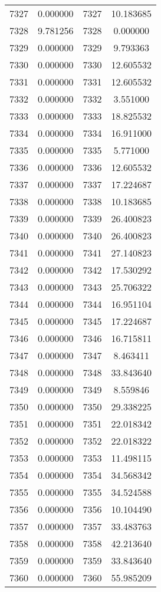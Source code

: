 \documentclass[12pt]{article}
\begin{document}
\begin{longtable}{@{}cccc@{}}
7327 & 0.000000 & 7327 & 10.183685 \\
7328 & 9.781256 & 7328 & 0.000000 \\
7329 & 0.000000 & 7329 & 9.793363 \\
7330 & 0.000000 & 7330 & 12.605532 \\
7331 & 0.000000 & 7331 & 12.605532 \\
7332 & 0.000000 & 7332 & 3.551000 \\
7333 & 0.000000 & 7333 & 18.825532 \\
7334 & 0.000000 & 7334 & 16.911000 \\
7335 & 0.000000 & 7335 & 5.771000 \\
7336 & 0.000000 & 7336 & 12.605532 \\
7337 & 0.000000 & 7337 & 17.224687 \\
7338 & 0.000000 & 7338 & 10.183685 \\
7339 & 0.000000 & 7339 & 26.400823 \\
7340 & 0.000000 & 7340 & 26.400823 \\
7341 & 0.000000 & 7341 & 27.140823 \\
7342 & 0.000000 & 7342 & 17.530292 \\
7343 & 0.000000 & 7343 & 25.706322 \\
7344 & 0.000000 & 7344 & 16.951104 \\
7345 & 0.000000 & 7345 & 17.224687 \\
7346 & 0.000000 & 7346 & 16.715811 \\
7347 & 0.000000 & 7347 & 8.463411 \\
7348 & 0.000000 & 7348 & 33.843640 \\
7349 & 0.000000 & 7349 & 8.559846 \\
7350 & 0.000000 & 7350 & 29.338225 \\
7351 & 0.000000 & 7351 & 22.018342 \\
7352 & 0.000000 & 7352 & 22.018322 \\
7353 & 0.000000 & 7353 & 11.498115 \\
7354 & 0.000000 & 7354 & 34.568342 \\
7355 & 0.000000 & 7355 & 34.524588 \\
7356 & 0.000000 & 7356 & 10.104490 \\
7357 & 0.000000 & 7357 & 33.483763 \\
7358 & 0.000000 & 7358 & 42.213640 \\
7359 & 0.000000 & 7359 & 33.843640 \\
7360 & 0.000000 & 7360 & 55.985209 \\

\end{longtable}
\end{document}
